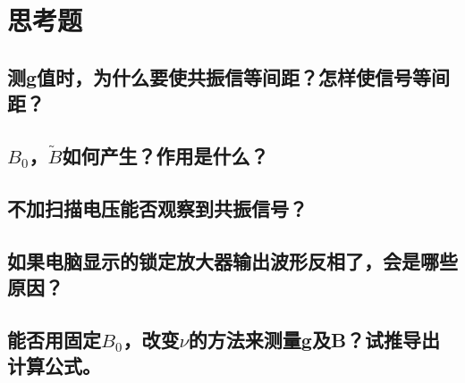 \documentclass[a4paper]{article}
\begin{document}
\section{思考题}
\subsection{测g值时，为什么要使共振信等间距？怎样使信号等间距？}
\subsection{$B_0$，$\tilde{B}$如何产生？作用是什么？}
\subsection{不加扫描电压能否观察到共振信号？}
\subsection{如果电脑显示的锁定放大器输出波形反相了，会是哪些原因？}
\subsection{能否用固定$B_0$，改变$\nu$的方法来测量g及B？试推导出计算公式。}

\nocite{jiaocai}

\end{document}
